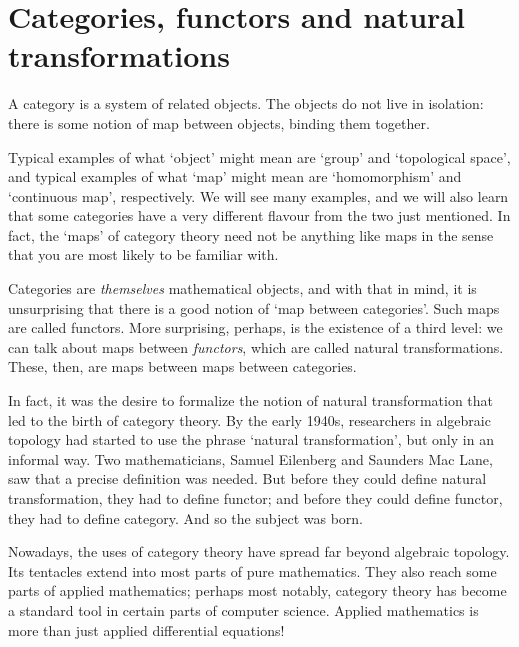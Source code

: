 %
%
%

\chapter{Categories, functors and natural transformations}
\label{ch:cfnt}

A category is a system of related objects.  The objects do not live in
isolation: there is some notion of map between objects, binding them
together.

Typical examples of what `object' might mean are `group' and `topological
space', and typical examples of what `map' might mean are `homomorphism'
and `continuous map', respectively.  We will see many examples, and we will
also learn that some categories have a very different flavour from the two
just mentioned.  In fact, the `maps' of category theory need not be
anything like maps in the sense that you are most likely to be familiar
with.

Categories are \emph{themselves} mathematical objects, and with that in
mind, it is unsurprising that there is a good notion of `map between
categories'.  Such maps are called functors.  More surprising, perhaps, is
the existence of a third level: we can talk about maps between
\emph{functors}, which are called natural transformations.  These, then,
are maps between maps between categories.

In fact, it was the desire to formalize the notion of natural
transformation that led to the birth of category theory.  By the early
1940s, researchers in algebraic topology had started to use the phrase
`natural transformation', but only in an informal way.  Two mathematicians,
Samuel Eilenberg%
%
%
and Saunders Mac Lane,%
%
%
saw that a precise definition was needed.  But before they could define
natural transformation, they had to define functor; and before they could
define functor, they had to define category.  And so the subject was born.

Nowadays, the uses of category theory have spread far beyond algebraic
topology.  Its tentacles extend into most parts of pure mathematics.  They
also reach some parts of applied mathematics; perhaps most notably,
category theory has become a standard tool in certain parts of computer%
%
%
science.  Applied%
%
%
mathematics is more than just applied differential equations!



